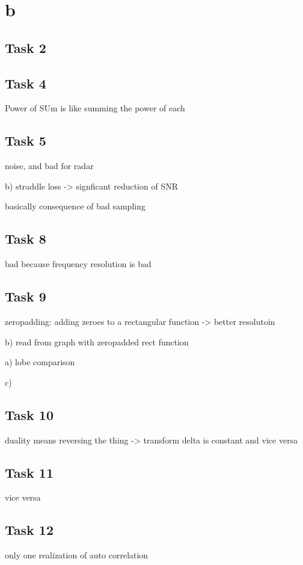 \documentclass[11pt]{report}
\begin{document}
\section{b}

\subsection{Task 2}

\subsection{Task 4}
Power of SUm is like summing the power of each

\subsection{Task 5}
noise, and bad for radar

b) straddle loss -> signficant reduction of SNR

basically consequence of bad sampling

\subsection{Task 8}
bad because frequency resolution is bad

\subsection{Task 9}
zeropadding: adding zeroes to a rectangular function -> better resolutoin

b) read from graph with zeropadded rect function

a) lobe comparison

c)

\subsection{Task 10}
duality means reversing the thing -> transform delta is constant and vice versa

\subsection{Task 11}

vice versa

\subsection{Task 12}
only one realization of auto correlation
\end{document}
